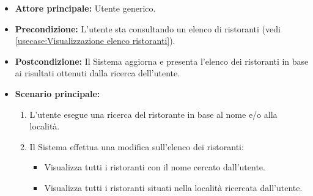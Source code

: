 \label{usecase:Ricerca ristoranti}
\begin{itemize}
	\item \textbf{Attore principale:} Utente generico.
	
	\item \textbf{Precondizione:} L'utente sta consultando un elenco di ristoranti (vedi \autoref{usecase:Visualizzazione elenco ristoranti}).

	\item \textbf{Postcondizione:} Il Sistema aggiorna e presenta l'elenco dei ristoranti in base ai risultati ottenuti dalla ricerca dell'utente.
 
	      
	\item \textbf{Scenario principale:}
	      \begin{enumerate}
		      \item L'utente esegue una ricerca del ristorante in base al nome e/o alla località.

		      \item Il Sistema effettua una modifica sull'elenco dei ristoranti:
		      \begin{itemize}
                \item Visualizza tutti i ristoranti con il nome cercato dall'utente.
                \item Visualizza tutti i ristoranti situati nella località ricercata dall'utente.
              \end{itemize}
	      \end{enumerate}
\end{itemize}


